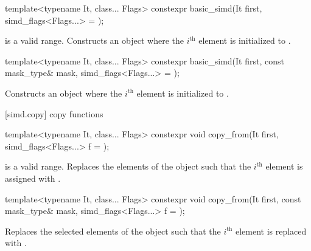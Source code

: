 \begin{itemdecl}
template<typename It, class... Flags>
  constexpr basic_simd(It first, simd_flags<Flags...> = {});
\end{itemdecl}

\begin{itemdescr}
  \SimdLoadDescr
    {\tcode{[first, first + size())} is a valid range.}
    {Constructs an object where the $i^\text{th}$ element is initialized to  \foralli.}
\end{itemdescr}

\begin{itemdecl}
template<typename It, class... Flags>
  constexpr basic_simd(It first, const mask_type& mask, simd_flags<Flags...> = {});
\end{itemdecl}

\begin{itemdescr}
  \SimdLoadDescr
    {\validMaskedRange}
    {Constructs an object where the $i^\text{th}$ element is initialized to  \foralli.}
\end{itemdescr}

[simd.copy]{ copy functions}

\begin{itemdecl}
template<typename It, class... Flags>
  constexpr void copy_from(It first, simd_flags<Flags...> f = {});
\end{itemdecl}

\begin{itemdescr}
  \SimdLoadDescr
    {\tcode{[first, first + size())} is a valid range.}
    {Replaces the elements of the  object such that the $i^\text{th}$ element is assigned with  \foralli.}
\end{itemdescr}

\begin{itemdecl}
template<typename It, class... Flags>
  constexpr void copy_from(It first, const mask_type& mask, simd_flags<Flags...> f = {});
\end{itemdecl}

\begin{itemdescr}
  \SimdLoadDescr
    {\validMaskedRange}
    {Replaces the selected elements of the  object such that the $i^\text{th}$ element is replaced with  \forallmaskedi.}
\end{itemdescr}

